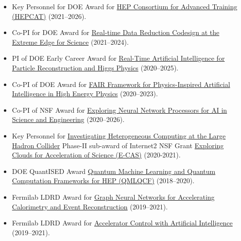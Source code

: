 \documentclass[11pt]{res}
\begin{document}
\begin{resume}
\begin{itemize}
    \item Key Personnel for DOE Award for \href{https://science.osti.gov/-/media/hep/pdf/Awards/HEP_instrumentation_awards_list.pdf}{HEP Consortium for Advanced Training (HEPCAT)} ({2021--2026}).
    \item Co-PI for DOE Award for \href{https://science.osti.gov/-/media/ascr/pdf/funding/2021/Data_Reduction_Awards.pdf}{Real-time Data Reduction Codesign at the Extreme Edge for Science} ({2021--2024}).
    \item PI of DOE Early Career Award for \href{https://science.osti.gov/-/media/early-career/pdf/FY20_DOE_SC_Early_Career_Research_Program_Abstracts.pdf}{Real-Time Artificial Intelligence for Particle Reconstruction and Higgs Physics} ({2020--2025}).
    \item Co-PI of DOE Award for \href{https://science.osti.gov/-/media/ascr/pdf/programdocuments/docs/2020/List_of_Awards_FAIR_Data.pdf}{FAIR Framework for Physics-Inspired Artificial Intelligence in High Energy Physics} ({2020--2023}).
    \item Co-PI of NSF Award for \href{https://nsf.gov/awardsearch/showAward?AWD_ID=2005369}{Exploring Neural Network Processors for AI in Science and Engineering} ({2020--2026}).
    \item Key Personnel for \href{https://www.internet2.edu/news/detail/17957/}{Investigating Heterogeneous Computing at the Large Hadron Collider} Phase-II sub-award of Internet2 NSF Grant \href{https://www.nsf.gov/awardsearch/showAward?AWD_ID=1904444}{Exploring Clouds for Acceleration of Science (E-CAS)} ({2020-2021}).
    \item DOE QuantISED Award \href{https://pamspublic.science.energy.gov/WebPAMSExternal/Interface/Common/ViewPublicAbstract.aspx?rv=1f7d4729-6f93-40bd-a55f-c108545b1ea9&rtc=24&PRoleId=10}{Quantum Machine Learning and Quantum Computation Frameworks for HEP (QMLQCF)} ({2018--2020}).
    \item Fermilab LDRD Award for \href{https://ldrd.fnal.gov/subdir/FNAL-LDRD-2019-017-D1.pdf}{Graph Neural Networks for Accelerating Calorimetry and Event Reconstruction} ({2019--2021}).
    \item Fermilab LDRD Award for \href{https://ldrd.fnal.gov/subdir/FNAL-LDRD-2019-027-D1.pdf}{Accelerator Control with Artificial Intelligence} ({2019--2021}).
  \end{itemize}


\end{resume}
\end{document}

